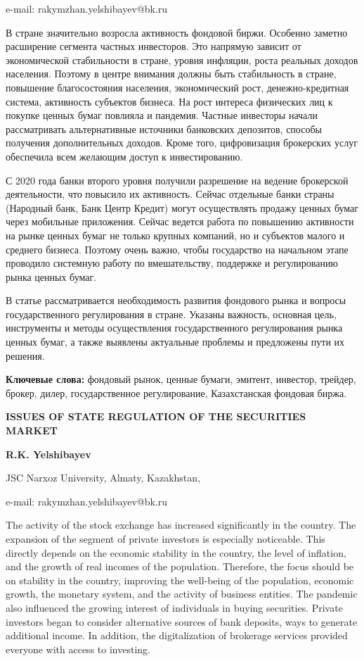 e-mail: rakymzhan.yelshibayev@bk.ru

В стране значительно возросла активность фондовой биржи. Особенно
заметно расширение сегмента частных инвесторов. Это напрямую зависит от
экономической стабильности в стране, уровня инфляции, роста реальных
доходов населения. Поэтому в центре внимания должны быть стабильность в
стране, повышение благосостояния населения, экономический рост,
денежно-кредитная система, активность субъектов бизнеса. На рост
интереса физических лиц к покупке ценных бумаг повлияла и пандемия.
Частные инвесторы начали рассматривать альтернативные источники
банковских депозитов, способы получения дополнительных доходов. Кроме
того, цифровизация брокерских услуг обеспечила всем желающим доступ к
инвестированию.

С 2020 года банки второго уровня получили разрешение на ведение
брокерской деятельности, что повысило их активность. Сейчас отдельные
банки страны (Народный банк, Банк Центр Кредит) могут осуществлять
продажу ценных бумаг через мобильные приложения. Сейчас ведется работа
по повышению активности на рынке ценных бумаг не только крупных
компаний, но и субъектов малого и среднего бизнеса. Поэтому очень важно,
чтобы государство на начальном этапе проводило системную работу по
вмешательству, поддержке и регулированию рынка ценных бумаг.

В статье рассматривается необходимость развития фондового рынка и
вопросы государственного регулирования в стране. Указаны важность,
основная цель, инструменты и методы осуществления государственного
регулирования рынка ценных бумаг, а также выявлены актуальные проблемы и
предложены пути их решения.

{\bfseries Ключевые слова:} фондовый рынок, ценные бумаги, эмитент,
инвестор, трейдер, брокер, дилер, государственное регулирование,
Казахстанская фондовая биржа.

{\bfseries ISSUES OF STATE REGULATION OF THE SECURITIES MARKET}

{\bfseries R.K. Yelshibayev}

JSC Narxoz University, Almaty, Kazakhstan,

e-mail: rakymzhan.yelshibayev@bk.ru

The activity of the stock exchange has increased significantly in the
country. The expansion of the segment of private investors is especially
noticeable. This directly depends on the economic stability in the
country, the level of inflation, and the growth of real incomes of the
population. Therefore, the focus should be on stability in the country,
improving the well-being of the population, economic growth, the
monetary system, and the activity of business entities. The pandemic
also influenced the growing interest of individuals in buying
securities. Private investors began to consider alternative sources of
bank deposits, ways to generate additional income. In addition, the
digitalization of brokerage services provided everyone with access to
investing.

